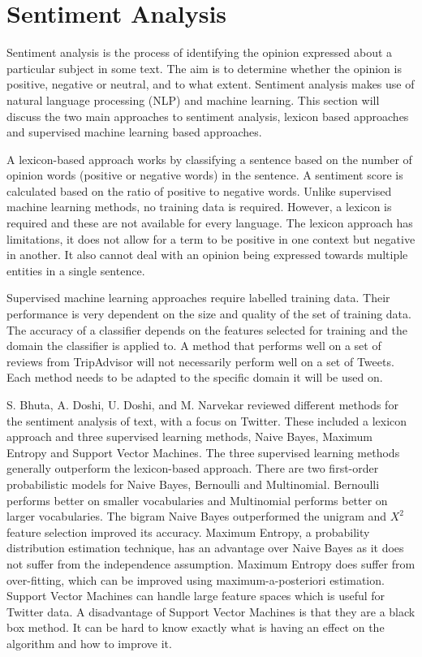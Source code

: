 \section{Sentiment Analysis}

Sentiment analysis is the process of identifying the opinion expressed about a particular subject in some text. The aim is to determine whether the opinion is positive, negative or neutral, and to what extent. Sentiment analysis makes use of natural language processing (NLP) and machine learning. This section will discuss the two main approaches to sentiment analysis, lexicon based approaches and supervised machine learning based approaches. 

A lexicon-based approach works by classifying a sentence based on the number of opinion words (positive or negative words) in the sentence. A sentiment score is calculated based on the ratio of positive to negative words. Unlike supervised machine learning methods, no training data is required. However, a lexicon is required and these are not available for every language. The lexicon approach has limitations, it does not allow for a term to be positive in one context but negative in another. It also cannot deal with an opinion being expressed towards multiple entities in a single sentence.

Supervised machine learning approaches require labelled training data. Their performance is very dependent on the size and quality of the set of training data. The accuracy of a classifier depends on the features selected for training and the domain the classifier is applied to. A method that performs well on a set of reviews from TripAdvisor will not necessarily perform well on a set of Tweets. Each method needs to be adapted to the specific domain it will be used on.

S. Bhuta, A. Doshi, U. Doshi, and M. Narvekar \cite{Bhuta2014} reviewed different methods for the sentiment analysis of text, with a focus on Twitter. These included a lexicon approach and three supervised learning methods, Naive Bayes, Maximum Entropy and Support Vector Machines. The three supervised learning methods generally outperform the lexicon-based approach. There are two first-order probabilistic models for Naive Bayes, Bernoulli and Multinomial. Bernoulli performs better on smaller vocabularies and Multinomial performs better on larger vocabularies. The bigram Naive Bayes outperformed the unigram and ${X}^2$ feature selection improved its accuracy. Maximum Entropy, a probability distribution estimation technique, has an advantage over Naive Bayes as it does not suffer from the independence assumption. Maximum Entropy does suffer from over-fitting, which can be improved using maximum-a-posteriori estimation. Support Vector Machines can handle large feature spaces which is useful for Twitter data. A disadvantage of Support Vector Machines is that they are a black box method. It can be hard to know exactly what is having an effect on the algorithm and how to improve it.

